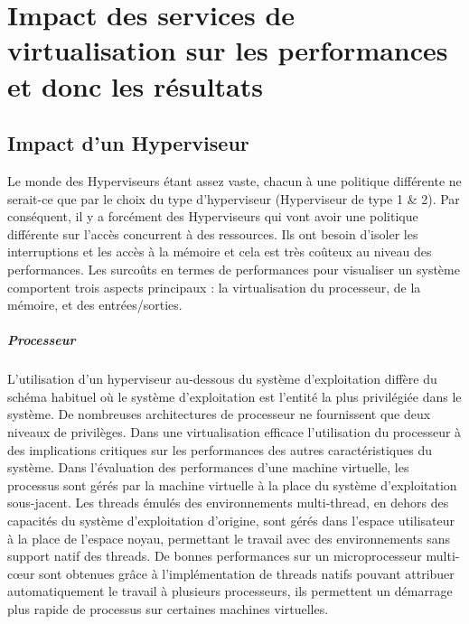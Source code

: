 \section{Impact des services de virtualisation sur les performances et donc les résultats}
\subsection{Impact d'un Hyperviseur}
Le monde des Hyperviseurs étant assez vaste, chacun à une politique différente ne serait-ce que par le choix du type d'hyperviseur (Hyperviseur de type 1 \& 2). Par conséquent, il y a forcément des Hyperviseurs qui vont avoir une politique différente sur l'accès concurrent à des ressources. Ils ont besoin d'isoler les interruptions et les accès à la mémoire et cela est très coûteux au niveau des performances. Les surcoûts en termes de performances pour visualiser un système comportent trois aspects principaux : la virtualisation du processeur, de la mémoire, et des entrées/sorties. 

\subparagraph{Processeur}
L'utilisation d'un hyperviseur au-dessous du système d'exploitation diffère du schéma habituel où le système d'exploitation est l'entité la plus privilégiée dans le système. De nombreuses architectures de processeur ne fournissent que deux niveaux de privilèges. Dans une virtualisation efficace l'utilisation du processeur à des implications critiques sur les performances des autres caractéristiques du système. Dans l'évaluation des performances d'une machine virtuelle, les processus sont gérés par la machine virtuelle à la place du système d'exploitation sous-jacent. Les threads émulés des environnements multi-thread, en dehors des capacités du système d'exploitation d'origine, sont gérés dans l'espace utilisateur à la place de l'espace noyau, permettant le travail avec des environnements sans support natif des threads. De bonnes performances sur un microprocesseur multi-cœur sont obtenues grâce à l'implémentation de threads natifs pouvant attribuer automatiquement le travail à plusieurs processeurs, ils permettent un démarrage plus rapide de processus sur certaines machines virtuelles.


